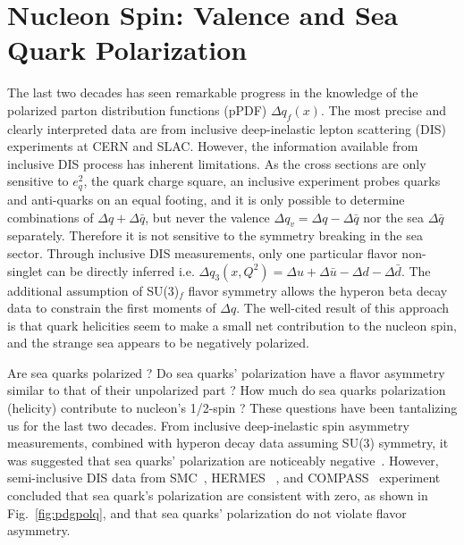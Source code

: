 
\section{Nucleon Spin: Valence and Sea Quark Polarization}
\label{sec:introduction}
The last two decades has seen remarkable progress in the knowledge 
of the polarized parton distribution functions (pPDF)
  $\Delta q_f(x)$.
The most precise and clearly interpreted data are from inclusive deep-inelastic
 lepton scattering (DIS)
experiments at CERN and SLAC. 
However, the information available from inclusive DIS process has inherent 
limitations.  As the cross 
sections are only sensitive to $e_q^2$, the quark charge square,
an inclusive experiment probes quarks and anti-quarks on an equal footing, and
 it is only possible to determine combinations of $\Delta q + \Delta \bar{q}$, 
but never the valence $\Delta q_v=\Delta q - \Delta \bar{q}$ nor the sea $\Delta \bar{q}$ separately.    
 Therefore it is not sensitive to the symmetry breaking in the sea sector. 
Through inclusive DIS measurements, only one particular flavor non-singlet can be directly 
inferred  i.e.  $\Delta q_{3}(x,Q^2)=\Delta u+\Delta \bar{u}-\Delta d-\Delta \bar{d}$. 
The additional assumption of SU(3)$_f$ flavor symmetry allows the hyperon beta decay data
to constrain the first moments of $\Delta q$.
The well-cited result of this approach is
that quark helicities seem to make a small net contribution to the nucleon spin, and the
strange sea appears to be negatively polarized.

Are sea quarks polarized ?  Do sea quarks' polarization have a flavor asymmetry similar to that of  their unpolarized part ?  
  How much do sea quarks polarization  (helicity) contribute to nucleon's 1/2-spin ? 
These questions have been tantalizing us for the last  two decades.   From inclusive deep-inelastic spin asymmetry measurements, combined with hyperon decay data assuming  SU(3) symmetry, it was suggested that sea quarks' polarization are noticeably negative~\cite{Blumlein:2010rn}.
 However,  semi-inclusive DIS data from SMC~\cite{Adeva:1997qz}, HERMES ~\cite{Airapetian:2004zf}, and COMPASS~\cite{Alekseev:2010ub} experiment concluded that sea quark's polarization are consistent with zero,  as shown in Fig.~\ref{fig:pdgpolq},  and that sea quarks' polarization do not violate flavor asymmetry.


